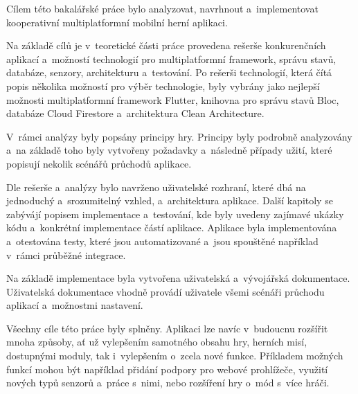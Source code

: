 \begin{conclusion}
Cílem této bakalářské práce bylo analyzovat, navrhnout a~implementovat
kooperativní multiplatformní mobilní herní aplikaci. 

Na základě cílů je v~teoretické části práce provedena rešerše
konkurenčních aplikací
a~možností technologií pro multiplatformní framework, správu stavů,
databáze, senzory, architekturu a~testování.
Po rešerši technologií,
která čítá popis několika možností pro výběr technologie,
byly vybrány jako nejlepší možnosti
multiplatformní framework Flutter,
knihovna pro správu stavů Bloc,
databáze Cloud Firestore
a~architektura Clean Architecture.

V~rámci analýzy byly popsány principy hry.
Principy byly podrobně analyzovány a~na základě toho byly vytvořeny
požadavky a~následně případy užití,
které popisují nekolik scénářů průchodů aplikace.

Dle rešerše a~analýzy bylo navrženo uživatelské rozhraní,
které dbá na jednoduchý a~srozumitelný vzhled,
a~architektura aplikace.
Další kapitoly se zabývájí popisem implementace a~testování,
kde byly uvedeny zajímavé ukázky kódu
a~konkrétní implementace částí aplikace.
Aplikace byla implementována a~otestována testy,
které jsou automatizované a~jsou spouštěné například v~rámci průběžné integrace.

Na základě implementace byla vytvořena uživatelská a~vývojářská dokumentace.
Uživatelská dokumentace vhodně provádí uživatele všemi scénáři průchodu
aplikací a~možnostmi nastavení.

Všechny cíle této práce byly splněny.
Aplikaci lze navíc v~budoucnu rozšířit mnoha způsoby,
ať už vylepšením samotného obsahu hry, herních misí, dostupnými moduly,
tak i~vylepšením o~zcela nové funkce.
Příkladem možných funkcí mohou být například
přidání podpory pro webové prohlížeče,
využití nových typů senzorů a~práce s~nimi,
nebo rozšíření hry o~mód s~více hráči.
\end{conclusion}
